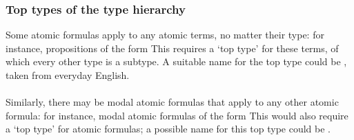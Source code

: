 \documentclass[../main.tex]{subfiles}
\begin{document}
\subsubsection{Top types of the type hierarchy}
Some atomic formulas apply to any atomic terms, no matter their type: for instance, propositions of the form  This requires a `top type' for these terms, of which every other type is a subtype. A suitable name for the top type could be , taken from everyday English. 
\\
\\
Similarly, there may be modal atomic formulas that apply to any other atomic formula: for instance, modal atomic formulas of the form  This would also require a `top type' for atomic formulas; a possible name for this top type could be .

\end{document}
